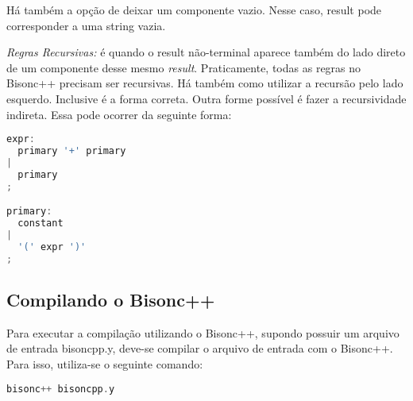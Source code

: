 \begin{apendicesenv}
\par 
\indent Há também a opção de deixar um componente vazio. Nesse caso, result pode corresponder a uma string vazia.
\par 
\indent \textit{Regras Recursivas:} é quando o result não-terminal aparece também do lado direto de um componente desse mesmo \textit{result}. Praticamente, todas as regras no Bisonc++ precisam ser recursivas. Há também como utilizar a recursão pelo lado esquerdo. Inclusive é a forma correta. Outra forme possível é fazer a recursividade indireta. Essa pode ocorrer da seguinte forma:

\begin{lstlisting}[language=c,  caption=Exemplo de Regra Gramatical Utilizando Recursividade]
expr:     
  primary '+' primary
|
  primary
;

primary:
  constant
|
  '(' expr ')'
;
\end{lstlisting}

\subsection{Compilando o Bisonc++}
Para executar a compilação utilizando o Bisonc++, supondo possuir um arquivo de entrada bisoncpp.y, deve-se compilar o arquivo de entrada com o Bisonc++. Para isso, utiliza-se o seguinte comando:
\begin{lstlisting}[language=c,  caption=Comando para Compilação do Bisonc++]
bisonc++ bisoncpp.y
\end{lstlisting}


\end{apendicesenv}
